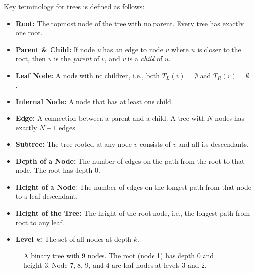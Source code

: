 \documentclass[10pt,journal,compsoc,onecolumn]{IEEEtran}
\begin{document}
Key terminology for trees is defined as follows:
\begin{itemize}
    \item \textbf{Root:} The topmost node of the tree with no parent. Every tree has exactly one root.
    \item \textbf{Parent \& Child:} If node $u$ has an edge to node $v$ where $u$ is closer to the root, then $u$ is the \emph{parent} of $v$, and $v$ is a \emph{child} of $u$.
    \item \textbf{Leaf Node:} A node with no children, i.e., both $T_L(v) = \emptyset$ and $T_R(v) = \emptyset$.
    \item \textbf{Internal Node:} A node that has at least one child.
    \item \textbf{Edge:} A connection between a parent and a child. A tree with $N$ nodes has exactly $N - 1$ edges.
    \item \textbf{Subtree:} The tree rooted at any node $v$ consists of $v$ and all its descendants.
    \item \textbf{Depth of a Node:} The number of edges on the path from the root to that node. The root has depth $0$.
    \item \textbf{Height of a Node:} The number of edges on the longest path from that node to a leaf descendant.
    \item \textbf{Height of the Tree:} The height of the root node, i.e., the longest path from root to any leaf.
    \item \textbf{Level $k$:} The set of all nodes at depth $k$.
\end{itemize}

\begin{figure}[htbp]
\centering
{}
\caption{A binary tree with 9 nodes. The root (node 1) has depth 0 and height 3. Node 7, 8, 9, and 4 are leaf nodes at levels 3 and 2.}
\label{fig:binary_tree_example}
\end{figure}
\end{document}
